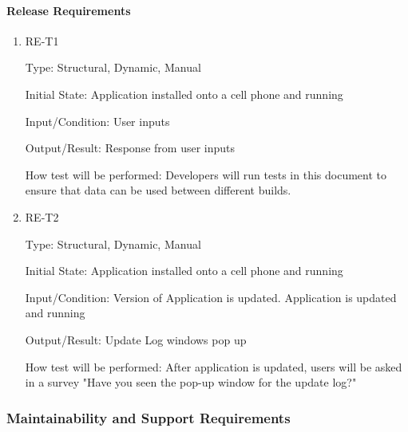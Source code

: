 \documentclass[12pt, titlepage]{article}
\begin{document}
\paragraph{Release Requirements}

\begin{enumerate}

\item{RE-T1\\}

Type: Structural, Dynamic, Manual
					
Initial State: Application installed onto a cell phone and running
					
Input/Condition: User inputs
					
Output/Result: Response from user inputs
					
How test will be performed: Developers will run tests in this document to ensure that data can be used between different builds.
					
\item{RE-T2\\}

Type: Structural, Dynamic, Manual
					
Initial State: Application installed onto a cell phone and running
					
Input/Condition: Version of Application is updated. Application is updated and running
					
Output/Result: Update Log windows pop up
					
How test will be performed: After application is updated, users will be asked in a survey "Have you seen the pop-up window for the update log?" 

\end{enumerate}

\subsubsection{Maintainability and Support Requirements}
\end{document}
